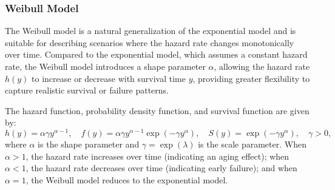 


\subsubsection{Weibull Model} \label{Weibull Model}
The Weibull model is a natural generalization of the exponential model and is suitable for describing scenarios where the hazard rate changes monotonically over time. Compared to the exponential model, which assumes a constant hazard rate, the Weibull model introduces a shape parameter $\alpha$, allowing the hazard rate $h(y)$ to increase or decrease with survival time $y$, providing greater flexibility to capture realistic survival or failure patterns.

The hazard function, probability density function, and survival function are given by:
$$
h(y) = \alpha \gamma y^{\alpha - 1}, 
\quad 
f(y) = \alpha \gamma y^{\alpha - 1} \exp(-\gamma y^{\alpha}), 
\quad 
S(y) = \exp(-\gamma y^{\alpha}),
\quad \gamma > 0,
$$
where $\alpha$ is the shape parameter and $\gamma = \exp(\lambda)$ is the scale parameter. When $\alpha > 1$, the hazard rate increases over time (indicating an aging effect); when $\alpha < 1$, the hazard rate decreases over time (indicating early failure); and when $\alpha = 1$, the Weibull model reduces to the exponential model.

